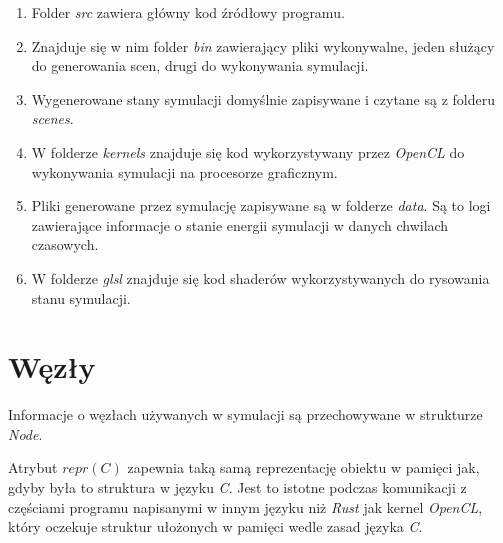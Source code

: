 \documentclass[12pt, letterpaper]{report}
\begin{document}
    \begin{enumerate}
        \item Folder \emph{src} zawiera główny kod źródłowy programu.
        
        \item Znajduje się w nim folder \emph{bin} zawierający pliki wykonywalne, 
        jeden służący do generowania scen, drugi do wykonywania symulacji. 

        \item Wygenerowane stany symulacji domyślnie zapisywane i czytane są z folderu \emph{scenes}.
        
        \item W folderze \emph{kernels} znajduje się kod wykorzystywany przez \emph{OpenCL} do 
        wykonywania symulacji na procesorze graficznym.
        
        \item Pliki generowane przez symulację zapisywane są w folderze \emph{data}. 
        Są to logi zawierające informacje o stanie energii symulacji w danych chwilach czasowych.

        \item W folderze \emph{glsl} znajduje się kod shaderów wykorzystywanych do rysowania stanu symulacji.
    \end{enumerate}

    \clearpage
    \section{Węzły}
    Informacje o węzłach używanych w symulacji są przechowywane w strukturze \emph{Node}.

    
    Atrybut $repr(C)$ zapewnia taką samą reprezentację obiektu w pamięci jak, gdyby była to
    struktura w języku \emph{C}. Jest to istotne podczas komunikacji z częściami programu napisanymi
    w innym języku niż \emph{Rust} jak kernel \emph{OpenCL}, który oczekuje struktur ułożonych w pamięci wedle zasad 
    języka \emph{C}.
\end{document}

